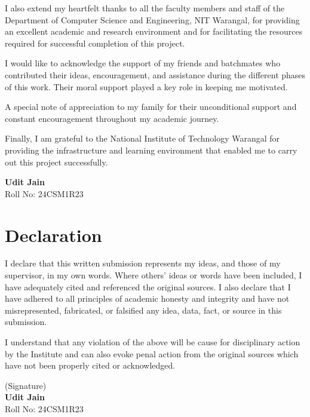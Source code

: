 \documentclass[a4paper,11pt,oneside]{book}
\begin{document}
I also extend my heartfelt thanks to all the faculty members and staff of the Department of Computer Science and Engineering, NIT Warangal, for providing an excellent academic and research environment and for facilitating the resources required for successful completion of this project.

I would like to acknowledge the support of my friends and batchmates who contributed their ideas, encouragement, and assistance during the different phases of this work. Their moral support played a key role in keeping me motivated.

A special note of appreciation to my family for their unconditional support and constant encouragement throughout my academic journey.

Finally, I am grateful to the National Institute of Technology Warangal for providing the infrastructure and learning environment that enabled me to carry out this project successfully.

\vspace{1cm}

\begin{flushright}
\textbf{Udit Jain} \\
Roll No: 24CSM1R23
\end{flushright}

\newpage

\chapter*{Declaration}
\vspace{1em}
I declare that this written submission represents my ideas, and those of my supervisor, in my own words. Where others’ ideas or words have been included, I have adequately cited and referenced the original sources. I also declare that I have adhered to all principles of academic honesty and integrity and have not misrepresented, fabricated, or falsified any idea, data, fact, or source in this submission.

I understand that any violation of the above will be cause for disciplinary action by the Institute and can also evoke penal action from the original sources which have not been properly cited or acknowledged.

\vspace{2cm}
\begin{flushright}
(Signature) \\
\textbf{Udit Jain} \\
Roll No: 24CSM1R23
\end{flushright}
\end{document}
